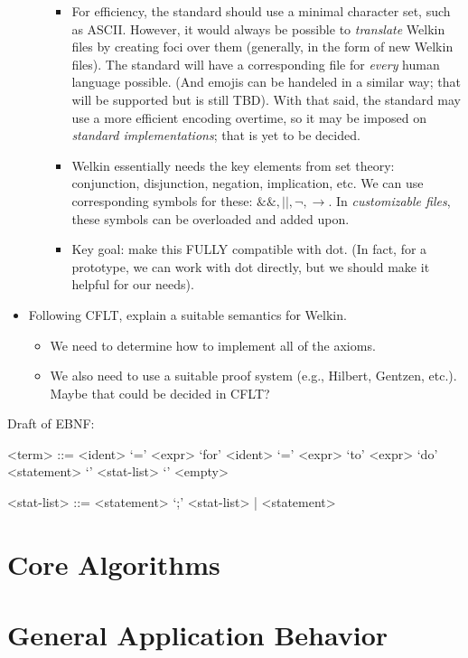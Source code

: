 \begin{itemize}
\begin{itemize}
          \begin{itemize}
            \item For efficiency, the standard should use a minimal character set, such as ASCII. However, it would always be possible to \textit{translate} Welkin files by creating foci over them (generally, in the form of new Welkin files). The standard will have a corresponding file for \textit{every} human language possible. (And emojis can be handeled in a similar way; that will be supported but is still TBD). With that said, the standard may use a more efficient encoding overtime, so it may be imposed on \textit{standard implementations}; that is yet to be decided.
            \item Welkin essentially needs the key elements from set theory: conjunction, disjunction, negation, implication, etc. We can use corresponding symbols for these: $\&\&, ||, \neg, \rightarrow$. In \textit{customizable files}, these symbols can be overloaded and added upon.
            \item Key goal: make this FULLY compatible with dot. (In fact, for a prototype, we can work with dot directly, but we should make it helpful for our needs).
          \end{itemize}
  \end{itemize}
  \item Following CFLT, explain a suitable semantics for Welkin.
        \begin{itemize}
          \item We need to determine how to implement all of the axioms.
          \item We also need to use a suitable proof system (e.g., Hilbert, Gentzen, etc.). Maybe that could be decided in CFLT?
        \end{itemize}
\end{itemize}

Draft of EBNF:

\begin{grammar}

<term> ::= <ident> `=' <expr>
\alt `for' <ident> `=' <expr> `to' <expr> `do' <statement>
\alt `{' <stat-list> `}'
\alt <empty>

<stat-list> ::= <statement> `;' <stat-list> | <statement>

\end{grammar}



\section{Core Algorithms}

\section{General Application Behavior}

\label{ch:spec}
